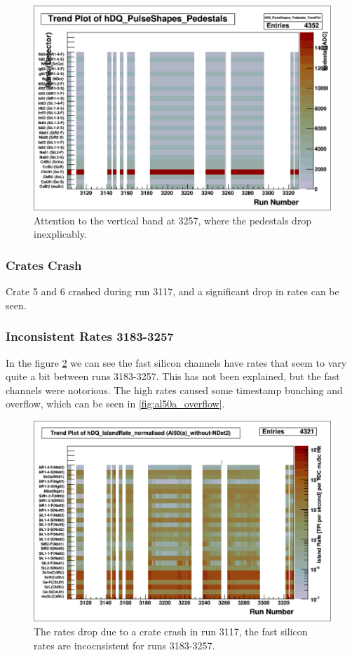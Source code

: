 \documentclass[a4paper]{article}
\begin{document}
\begin{figure}
  \centering
  \includegraphics[width=0.9\linewidth]{figs/al50a/ped}
  \caption{Attention to the vertical band at 3257, where the pedestals drop inexplicably.}
  \label{fig:al50a_ped}
\end{figure}

\subsubsection{Crates Crash}
\label{sec:al50a_crate_crash}
Crate 5 and 6 crashed during run 3117, and a significant drop in rates can be seen.

\subsubsection{Inconsistent Rates 3183-3257}
\label{sec:al50a_rates}
In the figure \ref{fig:al50a_rates} we can see the fast silicon channels have rates that seem to vary quite a bit between runs 3183-3257.
This has not been explained, but the fast channels were notorious. The high rates caused some timestamp bunching and overflow, which
can be seen in \ref{fig:al50a_overflow}.

\begin{figure}
  \centering
  \includegraphics[width=0.9\linewidth]{figs/al50a/rates.png}
  \caption{The rates drop due to a crate crash in run 3117, the fast silicon rates are incocnsistent for runs 3183-3257.}
  \label{fig:al50a_rates}
\end{figure}
\end{document}
